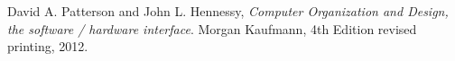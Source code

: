 









\begin{thebibliography}{9}

  David A. Patterson and John L. Hennessy,
  \emph{Computer Organization and Design, the software / hardware interface}.
  Morgan Kaufmann,
  4th Edition revised printing,
  2012.

\end{thebibliography}

